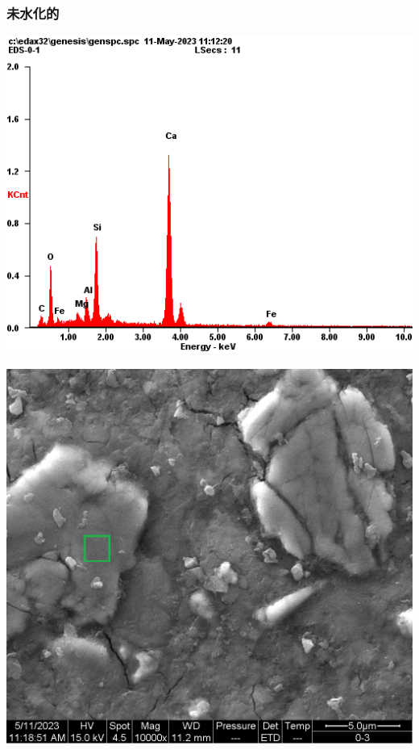 \subsubsection{未水化的}
\begin{minipage}{\textwidth}
  \begin{minipage}[b]{0.32\textwidth}
    \centering
    \includegraphics[width = \linewidth]{assets/spectrum/00-01-10000x-ETD-C3S.png}
  \end{minipage}
  \hfill
  \begin{minipage}[b]{0.32\textwidth}
    \centering
    \includegraphics[width = \linewidth]{assets/spectrum selection/00-01-10000x-ETD-C3S.png}

\end{minipage}
\end{minipage}
